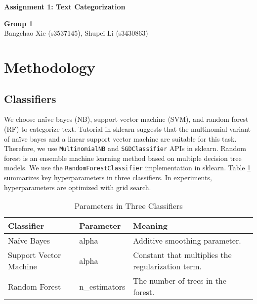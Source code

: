 \documentclass[12pt]{article}
\begin{document}
\begin{flushleft}
    \LARGE \textbf{Assignment 1: Text Categorization}
\end{flushleft}
\begin{flushleft}
    \textbf{Group 1}\\
    Bangchao Xie (s3537145), Shupei Li (s3430863)
\end{flushleft}
\section{Methodology}
\subsection{Classifiers}
We choose na\"ive bayes (NB), support vector machine (SVM), and random forest (RF) to categorize text. Tutorial in sklearn suggests that the multinomial variant of na\"ive bayes and a linear support vector machine are suitable for this task. Therefore, we use \texttt{MultinomialNB} and \texttt{SGDClassifier} APIs in sklearn. Random forest is an ensemble machine learning method based on multiple decision tree models. We use the \texttt{RandomForestClassifier} implementation in sklearn. Table \ref{tab:hyper}  summarizes key hyperparameters in three classifiers. In experiments, hyperparameters are optimized with grid search.
\begin{table}[h]
    \centering
    \caption{Parameters in Three Classifiers}
    \label{tab:hyper}

    \begin{tabular}{lll}
        \toprule
        \textbf{Classifier} & \textbf{Parameter} & \textbf{Meaning}\\
        \midrule
        Na\"ive Bayes & alpha & Additive smoothing parameter.\\
        Support Vector Machine & alpha & Constant that multiplies the regularization term.\\
        Random Forest & n\_estimators & The number of trees in the forest.\\
        \bottomrule
    \end{tabular}
\end{table}
\end{document}
